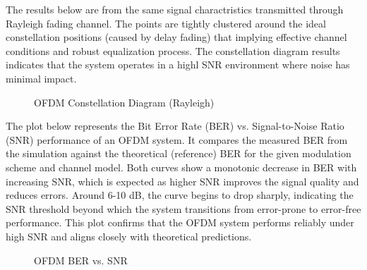 \documentclass[conference]{IEEEtran}
\begin{document}
\begin{enumerate}
  The results below are from the same signal charactristics transmitted through Rayleigh fading channel. The points are tightly clustered around the ideal constellation positions (caused by delay fading) that implying effective channel conditions and robust equalization process. The constellation diagram results indicates that the system operates in a highl SNR environment where noise has minimal impact. 

	\begin{figure}[H]
		\centering
    		\caption{OFDM Constellation Diagram  (Rayleigh)}
  	  \end{figure}

The plot below represents the Bit Error Rate (BER) vs. Signal-to-Noise Ratio (SNR) performance of an OFDM system. It compares the measured BER from the simulation against the theoretical (reference) BER for the given modulation scheme and channel model. Both curves show a monotonic decrease in BER with increasing SNR, which is expected as higher SNR improves the signal quality and reduces errors. Around 6-10 dB, the curve begins to drop sharply, indicating the SNR threshold beyond which the system transitions from error-prone to error-free performance. This plot confirms that the OFDM system performs reliably under high SNR and aligns closely with theoretical predictions.
    
    \begin{figure}[H]
		\centering
    		\caption{OFDM BER vs. SNR}
  	  \end{figure}
    


\end{enumerate}
\end{document}
